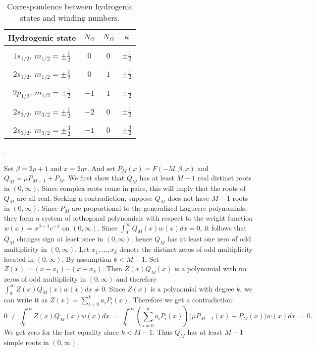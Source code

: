 \documentclass[11 pt]{article}
\renewcommand\({\left(}
\renewcommand\){\right)}
\renewcommand\b{\beta}
\newcommand\<{\langle}
\renewcommand\>{\rangle}
\newcommand\8{\infty}
\newcommand{\half}{\frac{1}{2}}
\begin{document}

\begin{table}[h!]
  \begin{center}
    \label{tab:table1}
    \begin{tabular}{c|c|c|c} %
      Hydrogenic state & $N_\Theta$ & $N_\Omega$ & $\kappa$ \\
      [.1cm]\hline
      & & & \\ 
      $1s_{1/2}$,\: $m_{1/2} = \pm \half$ & $0$ & $0$ & $\pm \half$ \\& & & \\
      $2s_{1/2}$,\: $m_{1/2} = \pm \half$ & $0$ & $1$ & $\pm \half$\\& & & \\
      $2p_{1/2}$,\: $m_{1/2} = \pm \half$ & $-1$ & $1$ & $\pm \half$\\     & & & \\ $2s_{3/2}$,\: $m_{3/2} = \pm \half$ & $-2$ & $0$ & $\pm \half$\\& & & \\
      $2s_{3/2}$,\: $m_{3/2} = \pm \frac{3}{2}$ & $-1$ & $0$ & $\pm \frac{3}{2}$\\ [.1cm]
    \end{tabular}
  \end{center}
  \caption{\small{Correspondence between hydrogenic states and winding numbers.}}
\end{table}

\medskip

.

\smallskip

Set $\b = 2\rho + 1$ and $x = 2 \eta r$. And set $P_M(x) = F(-M, \beta, x)$ and $Q_M = \mu P_{M-1} + P_M$. We first show that $Q_M$ has at least $M - 1$ real distinct roots in $(0, \infty)$. Since complex roots come in pairs, this will imply that the roots of $Q_M$ are all real. Seeking a contradiction, suppose $Q_M$ does not have $M - 1$ roots in $(0, \infty)$. Since $P_M$ are proportional to the generalized Laguerre polynomials, they form a system of orthogonal polynomials with respect to the weight function $w(x) = x^{\beta - 1}e^{-x}$ on $(0,\infty)$.  Since $\int_0^\infty Q_M(x)w(x)dx = 0$, it follows that $Q_M$ changes sign at least once in $(0, \infty)$; hence $Q_M$ has at least one zero of odd multiplicity in $(0, \infty)$. Let $x_1, \dotsc, x_k$ denote the distinct zeros of odd multiplicity located in $(0, \infty)$. By assumption $k < M -1$. Set $Z(x) =(x - x_1) \dotsb (x - x_k)$. Then $Z(x)Q_M(x)$ is a polynomial with no zeros of odd multiplicity in $(0, \infty)$ and therefore $\int_0^\infty Z(x) Q_M(x) w(x) dx \neq 0$. Since $Z(x)$ is a polynomial with degree $k$, we can write it as $Z(x) = \sum_{i = 0}^k a_i P_i(x)$. Therefore we get a contradiction: 
\[
0 \,\neq\, \int_0^\infty Z(x) Q_M(x) w(x) dx \,=\, \int_0^\infty \left(\sum_{i = 0}^k a_i P_i(x)\right)\big(\mu P_{M - 1}(x) + P_M(x)\big) w(x) dx \,=\, 0.   
\]
We get zero for the last equality since $k < M - 1$. Thus $Q_M$ has at least $M - 1$ simple roots in $(0, \infty)$. 
\end{document}

